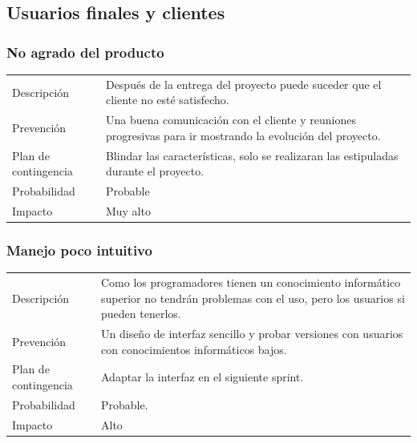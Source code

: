 \subsection{Usuarios finales y clientes}
\subsubsection{No agrado del producto}
\begin{table}[H]
    \begin{center}
        \begin{tabular}{l p{8cm}}
            Descripci\'{o}n                 & Despu\'{e}s de la entrega del proyecto puede suceder que el cliente no est\'{e} 
            								  satisfecho. \\
            Prevenci\'{o}n                  & Una buena comunicación con el cliente y reuniones progresivas para ir mostrando la 
            								  evolución del proyecto. \\ 
            Plan de contingencia            & Blindar las caracter\'{i}sticas, solo se realizaran las estipuladas durante el 
            							   	  proyecto. \\
            Probabilidad                    & Probable \\
            Impacto                         & Muy alto \\
        \end{tabular}
    \end{center}
    
\end{table}

\subsubsection{Manejo poco intuitivo}
\begin{table}[H]
    \begin{center}
        \begin{tabular}{l p{8cm}}
            Descripci\'{o}n                 & Como  los  programadores  tienen  un  conocimiento
            inform\'{a}tico superior no tendr\'{a}n problemas con el uso, pero los usuarios si pueden tenerlos.\\
            Prevenci\'{o}n                  & Un diseño de interfaz sencillo y probar versiones con
            usuarios con conocimientos inform\'{a}ticos bajos. \\ 
            Plan de contingencia            & Adaptar la interfaz en el siguiente sprint. \\
            Probabilidad                    & Probable. \\
            Impacto                         & Alto \\
        \end{tabular}
    \end{center}
    
\end{table}

